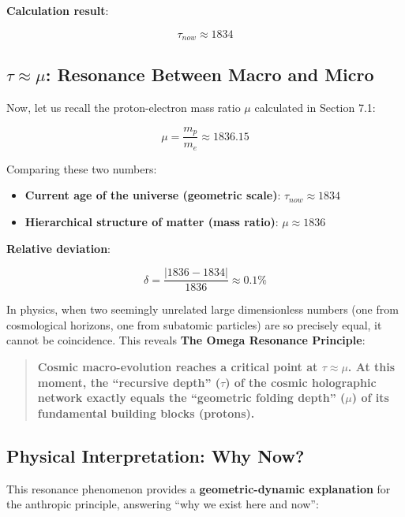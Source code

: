 \textbf{Calculation result}:

\[\tau_{now} \approx 1834\]

\subsection{\texorpdfstring{$\tau \approx \mu$}{tau approx mu}: Resonance Between Macro and Micro}

Now, let us recall the proton-electron mass ratio $\mu$ calculated in Section 7.1:

\[\mu = \frac{m_p}{m_e} \approx 1836.15\]

Comparing these two numbers:

\begin{itemize}
\item \textbf{Current age of the universe (geometric scale)}: $\tau_{now} \approx 1834$
\item \textbf{Hierarchical structure of matter (mass ratio)}: $\mu \approx 1836$
\end{itemize}

\textbf{Relative deviation}:

\[\delta = \frac{|1836 - 1834|}{1836} \approx 0.1\%\]

In physics, when two seemingly unrelated large dimensionless numbers (one from cosmological horizons, one from subatomic particles) are so precisely equal, it cannot be coincidence. This reveals \textbf{The Omega Resonance Principle}:

\begin{quote}
\textbf{Cosmic macro-evolution reaches a critical point at $\tau \approx \mu$. At this moment, the ``recursive depth'' ($\tau$) of the cosmic holographic network exactly equals the ``geometric folding depth'' ($\mu$) of its fundamental building blocks (protons).}
\end{quote}

\subsection{Physical Interpretation: Why Now?}

This resonance phenomenon provides a \textbf{geometric-dynamic explanation} for the anthropic principle, answering ``why we exist here and now'':

